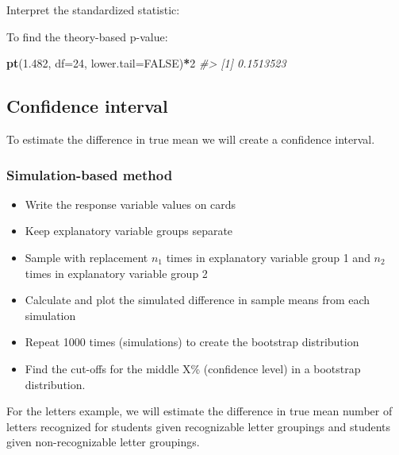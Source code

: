 \documentclass[
]{report}
\newenvironment{Shaded}{\begin{snugshade}}{\end{snugshade}}
\newcommand{\AttributeTok}[1]{\textcolor[rgb]{0.13,0.29,0.53}{#1}}
\newcommand{\CommentTok}[1]{\textcolor[rgb]{0.56,0.35,0.01}{\textit{#1}}}
\newcommand{\ConstantTok}[1]{\textcolor[rgb]{0.56,0.35,0.01}{#1}}
\newcommand{\DecValTok}[1]{\textcolor[rgb]{0.00,0.00,0.81}{#1}}
\newcommand{\FloatTok}[1]{\textcolor[rgb]{0.00,0.00,0.81}{#1}}
\newcommand{\FunctionTok}[1]{\textcolor[rgb]{0.13,0.29,0.53}{\textbf{#1}}}
\newcommand{\NormalTok}[1]{#1}
\newcommand{\SpecialCharTok}[1]{\textcolor[rgb]{0.81,0.36,0.00}{\textbf{#1}}}
\begin{document}
Interpret the standardized statistic:

\vspace{0.8in}

To find the theory-based p-value:

\begin{Shaded}
\begin{Highlighting}[]
\FunctionTok{pt}\NormalTok{(}\FloatTok{1.482}\NormalTok{, }\AttributeTok{df=}\DecValTok{24}\NormalTok{, }\AttributeTok{lower.tail=}\ConstantTok{FALSE}\NormalTok{)}\SpecialCharTok{*}\DecValTok{2}
\CommentTok{\#\textgreater{} [1] 0.1513523}
\end{Highlighting}
\end{Shaded}

\newpage

\hypertarget{confidence-interval-7}{%
\subsection*{Confidence interval}\label{confidence-interval-7}}

To estimate the difference in true mean we will create a confidence interval.

\hypertarget{simulation-based-method-7}{%
\subsubsection*{Simulation-based method}\label{simulation-based-method-7}}

\begin{itemize}
\item
  Write the response variable values on cards
\item
  Keep explanatory variable groups separate
\item
  Sample with replacement \(n_1\) times in explanatory variable group 1 and \(n_2\) times in explanatory variable group 2
\item
  Calculate and plot the simulated difference in sample means from each simulation
\item
  Repeat 1000 times (simulations) to create the bootstrap distribution
\item
  Find the cut-offs for the middle X\% (confidence level) in a bootstrap distribution.
\end{itemize}

For the letters example, we will estimate the difference in true mean number of letters recognized for students given recognizable letter groupings and students given non-recognizable letter groupings.
\end{document}
